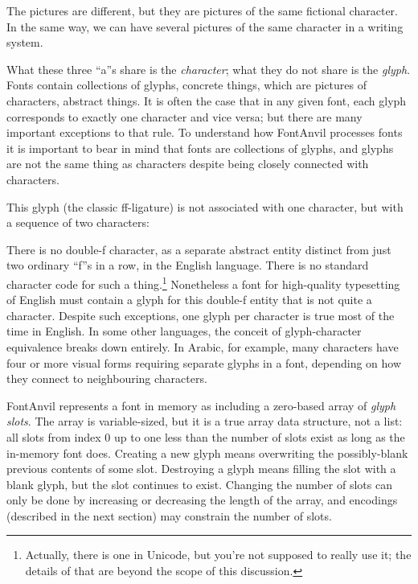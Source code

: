 \documentclass[11pt]{report}
\begin{document}
The pictures are different, but they are pictures of the same fictional
character.  In the same way, we can have several pictures of the same
character in a writing system.

\begin{center}
\qquad
{}\qquad
{}
\end{center}

What these three ``a''s share is the \emph{character}; what they do not
share is the \emph{glyph}.  Fonts contain collections of glyphs, concrete
things, which are pictures of characters, abstract things.  It is often the
case that in any given font, each glyph corresponds to exactly one character
and vice versa; but there are many important exceptions to that rule.  To
understand how FontAnvil processes fonts it is important to bear in mind
that fonts are collections of glyphs, and glyphs are not the same thing as
characters despite being closely connected with characters.

This glyph (the classic ff-ligature) is not associated with one character,
but with a sequence of two characters:

\begin{center}
\end{center}

There is no double-f character, as a separate abstract entity distinct from
just two ordinary ``f''s in a row, in the English language.  There is no
standard character code for such a thing.\footnote{Actually, there is one in
Unicode, but you're not supposed to really use it; the details of that are
beyond the scope of this discussion.} Nonetheless a font for high-quality
typesetting of English must contain a glyph for this double-f entity
that is not quite a character.  Despite such exceptions, one glyph per
character is true most of the time in English.  In some other languages, the
conceit of glyph-character equivalence breaks down entirely.  In Arabic, for
example, many characters have four or more visual forms requiring
separate glyphs in a font, depending on how they connect to neighbouring
characters.

FontAnvil represents a font in memory as including a zero-based array of
\emph{glyph slots}.  The array is variable-sized, but it is a true array
data structure, not a list: all slots from index 0 up to one less than the
number of slots exist as long as the in-memory font does.  Creating a new
glyph means overwriting the possibly-blank previous contents of some slot. 
Destroying a glyph means filling the slot with a blank glyph, but the slot
continues to exist.  Changing the number of slots can only be done by
increasing or decreasing the length of the array, and encodings (described
in the next section) may constrain the number of slots.
\end{document}
